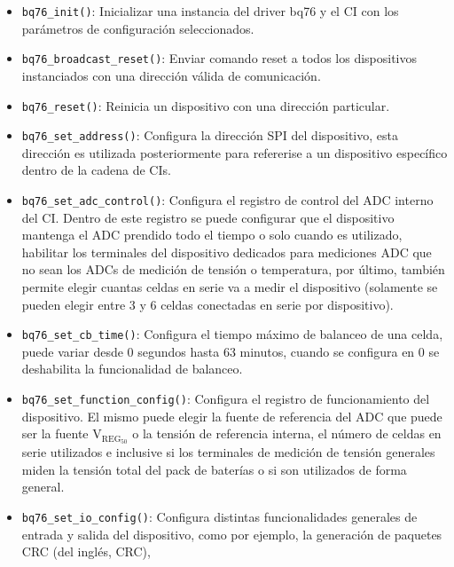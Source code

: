 \documentclass[10pt, a4paper]{report}
\begin{document}
\begin{itemize}
    \item \texttt{bq76\_init()}: Inicializar una instancia del driver bq76 y
        el \acrshort{CI} con los parámetros de configuración seleccionados.
    \item \texttt{bq76\_broadcast\_reset()}: Enviar comando reset a todos los
        dispositivos instanciados con una dirección válida de comunicación.
    \item \texttt{bq76\_reset()}: Reinicia un dispositivo con una direcci\'on
        particular.
    \item \texttt{bq76\_set\_address()}: Configura la direcci\'on \acrshort{SPI}
        del dispositivo, esta direcci\'on es utilizada posteriormente para
        refererise a un dispositivo espec\'ifico dentro de la cadena de
        \acrshort{CI}s.
    \item \texttt{bq76\_set\_adc\_control()}: Configura el registro de control
        del \acrshort{ADC} interno del \acrshort{CI}. Dentro de este registro se
        puede configurar que el dispositivo mantenga el \acrshort{ADC} prendido
        todo el tiempo o solo cuando es utilizado, habilitar los terminales del
        dispositivo dedicados para mediciones \acrshort{ADC} que no sean los
        \acrshort{ADC}s de medici\'on de tensi\'on o temperatura, por \'ultimo,
        tambi\'en permite elegir cuantas celdas en serie va a medir el 
        dispositivo (solamente se pueden elegir entre 3 y 6 celdas conectadas en 
        serie por dispositivo).
    \item \texttt{bq76\_set\_cb\_time()}: Configura el tiempo m\'aximo de 
        balanceo de una celda, puede variar desde 0 segundos hasta 63 minutos,
        cuando se configura en 0 se deshabilita la funcionalidad de balanceo.
    \item \texttt{bq76\_set\_function\_config()}: Configura el registro de 
        funcionamiento del dispositivo. El mismo puede elegir la fuente de
        referencia del \acrshort{ADC} que puede ser la fuente
        $\mathrm{V_{REG_{50}}}$ o la tensi\'on de referencia interna, el
        n\'umero de celdas en serie utilizados e inclusive si los terminales de
        medici\'on de tensi\'on generales miden la tensi\'on total del pack de
        bater\'ias o si son utilizados de forma general.
    \item \texttt{bq76\_set\_io\_config()}: Configura distintas funcionalidades
        generales de entrada y salida del dispositivo, como por ejemplo, la
        generaci\'on de paquetes \acrshort{CRC} (del ingl\'es, \acrlong{CRC}),

\end{itemize}
\end{document}
